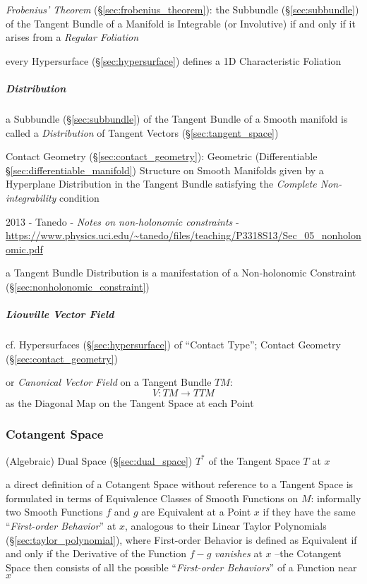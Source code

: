 \emph{Frobenius' Theorem} (\S\ref{sec:frobenius_theorem}): the Subbundle
(\S\ref{sec:subbundle}) of the Tangent Bundle of a Manifold is Integrable (or
Involutive) if and only if it arises from a \emph{Regular Foliation}

every Hypersurface (\S\ref{sec:hypersurface}) defines a 1D Characteristic
Foliation



\subparagraph{Distribution}\label{sec:tangent_bundle_distribution}\hfill

a Subbundle (\S\ref{sec:subbundle}) of the Tangent Bundle of a Smooth manifold
is called a \emph{Distribution} of Tangent Vectors (\S\ref{sec:tangent_space})

\fist Contact Geometry (\S\ref{sec:contact_geometry}): Geometric (Differentiable
\S\ref{sec:differentiable_manifold}) Structure on Smooth Manifolds given by a
Hyperplane Distribution in the Tangent Bundle satisfying the \emph{Complete
  Non-integrability} condition

2013 - Tanedo - \emph{Notes on non-holonomic constraints} -
\url{https://www.physics.uci.edu/~tanedo/files/teaching/P3318S13/Sec_05_nonholonomic.pdf}

a Tangent Bundle Distribution is a manifestation of a Non-holonomic Constraint
(\S\ref{sec:nonholonomic_constraint})



\subparagraph{Liouville Vector Field}\label{sec:liouville_vector_field}\hfill

cf. Hypersurfaces (\S\ref{sec:hypersurface}) of ``Contact Type''; \fist Contact
Geometry (\S\ref{sec:contact_geometry})

or \emph{Canonical Vector Field} on a Tangent Bundle $TM$:
\[
  V : TM \rightarrow TTM
\]
as the Diagonal Map on the Tangent Space at each Point



\subsubsection{Cotangent Space}\label{sec:cotangent_space}

(Algebraic) Dual Space (\S\ref{sec:dual_space}) $T^*$ of the Tangent Space $T$
at $x$

a direct definition of a Cotangent Space without reference to a Tangent Space
is formulated in terms of Equivalence Classes of Smooth Functions on $M$:
informally two Smooth Functions $f$ and $g$ are Equivalent at a Point $x$ if
they have the same ``\emph{First-order Behavior}'' at $x$, analogous to their
Linear Taylor Polynomials (\S\ref{sec:taylor_polynomial}), where First-order
Behavior is defined as Equivalent if and only if the Derivative of the Function
$f-g$ \emph{vanishes} at $x$ --the Cotangent Space then consists of all the
possible ``\emph{First-order Behaviors}'' of a Function near $x$

